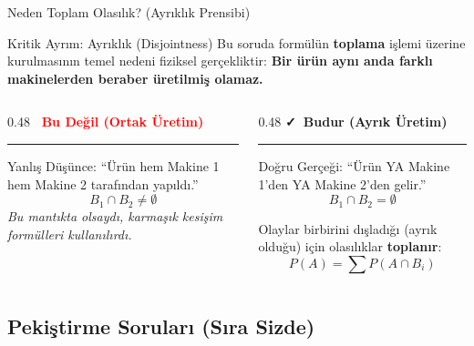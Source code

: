 \documentclass[light]{lutbeamer}
\begin{document}
\begin{frame}{Neden Toplam Olasılık? (Ayrıklık Prensibi)}
    \begin{alertblock}{Kritik Ayrım: Ayrıklık (Disjointness)}
        Bu soruda formülün \textbf{toplama} işlemi üzerine kurulmasının temel nedeni fiziksel gerçekliktir:
        \textbf{Bir ürün aynı anda farklı makinelerden beraber üretilmiş olamaz.}
    \end{alertblock}

    \vspace{0.5cm}
    \begin{columns}[T]
        \begin{column}{0.48\textwidth}
            \centering
            \textbf{\textcolor{red}{\faTimes\ Bu Değil (Ortak Üretim)}}
            \par\noindent\rule{0.8\textwidth}{0.4pt}
            \vspace{0.2cm}
            \scriptsize
            Yanlış Düşünce: ``Ürün hem Makine 1 hem Makine 2 tarafından yapıldı.''
            \[ B_1 \cap B_2 \neq \emptyset \]
            \textit{Bu mantıkta olsaydı, karmaşık kesişim formülleri kullanılırdı.}
        \end{column}
        \begin{column}{0.48\textwidth}
            \centering
            \textbf{\textcolor{green!60!black}{\faCheck\ Budur (Ayrık Üretim)}}
            \par\noindent\rule{0.8\textwidth}{0.4pt}
            \vspace{0.2cm}
            \scriptsize
            Doğru Gerçeği: ``Ürün YA Makine 1'den YA Makine 2'den gelir.''
            \[ B_1 \cap B_2 = \emptyset \]
            
            Olaylar birbirini dışladığı (ayrık olduğu) için olasılıklar \textbf{toplanır}:
            \[ P(A) = \sum P(A \cap B_i) \]
        \end{column}
    \end{columns}
\end{frame}

\subsection{Pekiştirme Soruları (Sıra Sizde)}
\end{document}

